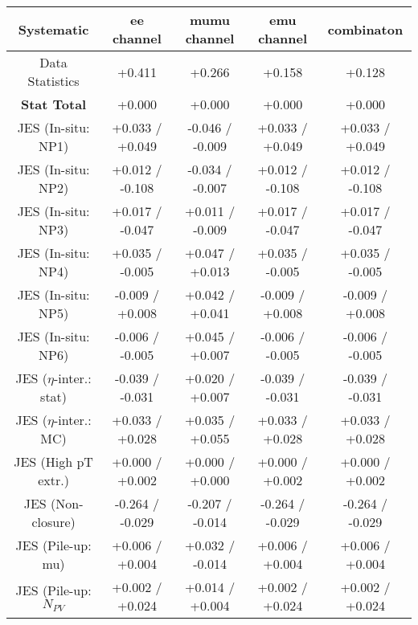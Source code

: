 \begin{table}[htbp]
\scriptsize
  \begin{center} 
  \begin{tabular}{|c|c|c|c|c|}
  \hline
Systematic                            &  ee channel&  mumu channel&  emu channel&  combinaton\\
  \hline
Data Statistics                       &+0.411              & +0.266              & +0.158              & +0.128             \\
\hline
\textbf{Stat Total}                   &+0.000              & +0.000              & +0.000              & +0.000             \\
\hline
JES (In-situ: NP1)                    &+0.033   / +0.049   & -0.046   / -0.009   & +0.033   / +0.049   & +0.033   / +0.049  \\
JES (In-situ: NP2)                    &+0.012   / -0.108   & -0.034   / -0.007   & +0.012   / -0.108   & +0.012   / -0.108  \\
JES (In-situ: NP3)                    &+0.017   / -0.047   & +0.011   / -0.009   & +0.017   / -0.047   & +0.017   / -0.047  \\
JES (In-situ: NP4)                    &+0.035   / -0.005   & +0.047   / +0.013   & +0.035   / -0.005   & +0.035   / -0.005  \\
JES (In-situ: NP5)                    &-0.009   / +0.008   & +0.042   / +0.041   & -0.009   / +0.008   & -0.009   / +0.008  \\
JES (In-situ: NP6)                    &-0.006   / -0.005   & +0.045   / +0.007   & -0.006   / -0.005   & -0.006   / -0.005  \\
JES ($\eta$-inter.: stat)               &-0.039   / -0.031   & +0.020   / +0.007   & -0.039   / -0.031   & -0.039   / -0.031  \\
JES ($\eta$-inter.: MC)                 &+0.033   / +0.028   & +0.035   / +0.055   & +0.033   / +0.028   & +0.033   / +0.028  \\
JES (High pT extr.)                  &+0.000   / +0.002   & +0.000   / +0.000   & +0.000   / +0.002   & +0.000   / +0.002  \\
JES (Non-closure)                     &-0.264   / -0.029   & -0.207   / -0.014   & -0.264   / -0.029   & -0.264   / -0.029  \\
JES (Pile-up: mu)                     &+0.006   / +0.004   & +0.032   / -0.014   & +0.006   / +0.004   & +0.006   / +0.004  \\
JES (Pile-up: $N_{PV}$                  &+0.002   / +0.024   & +0.014   / +0.004   & +0.002   / +0.024   & +0.002   / +0.024  \\

\end{tabular}
\end{center}
\end{table}
